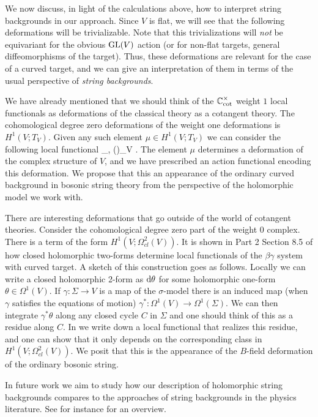 We now discuss, in light of the calculations above, how to interpret string backgrounds in our approach. 
Since $V$ is flat,
we will see that the following deformations will be trivializable. 
Note that this trivializations will {\em not} be equivariant for the obvious ${\rm GL}(V)$ action (or for non-flat targets, general diffeomorphisms of the target). 
Thus, these deformations are relevant for the case of a curved target, and we can give an interpretation of them in terms of the usual perspective of {\em string backgrounds}. 

We have already mentioned that we should think of the $\mathbb C^\times_{\rm cot}$ weight $1$ local functionals as deformations of the classical theory as a cotangent theory.
The cohomological degree zero deformations of the weight one deformations is $H^1(V ; T_V)$. 
Given any such element $\mu \in H^1(V ; T_V)$ we can consider the following local functional
\ben
\int_\Sigma \<\beta, \mu(\gamma)\>_V .
\een 
The element $\mu$ determines a deformation of the complex structure of $V$, and we have prescribed an action functional encoding this deformation. 
We propose that this an appearance of the ordinary curved background in bosonic string theory from the perspective of the holomorphic model we work with.

There are interesting deformations that go outside of the world of cotangent theories. 
Consider the cohomological degree zero part of the weight 0 complex. 
There is a term of the form $H^1(V ; \Omega^2_{cl}(V))$.
It is shown in Part 2 Section 8.5 of \cite{GGW} how closed holomorphic two-forms determine local functionals of the $\beta\gamma$ system with curved target. 
A sketch of this construction goes as follows.
Locally we can write a closed holomorphic 2-form as ${\rm d} \theta$ for some holomorphic one-form $\theta \in \Omega^1(V)$. 
If $\gamma : \Sigma \to V$ is a map of the $\sigma$-model there is an induced map (when $\gamma$ satisfies the equations of motion) $\gamma^* : \Omega^1(V) \to \Omega^1(\Sigma)$. 
We can then integrate $\gamma^* \theta$ along any closed cycle $C$ in $\Sigma$ and one should think of this as a residue along $C$. 
In \cite{GGW} we write down a local functional that realizes this residue, and one can show that it only depends on the corresponding class in $H^1(V ; \Omega^2_{cl}(V))$. 
We posit that this is the appearance of the $B$-field deformation of the ordinary bosonic string. 

In future work we aim to study how our description of holomorphic string backgrounds compares to the approaches of string backgrounds in the physics literature. 
See for instance \cite{CFMP} for an overview.


